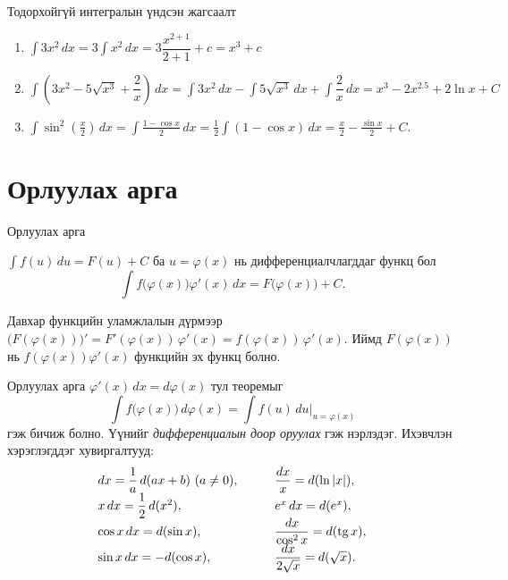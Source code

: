 \begin{frame}[allowframebreaks]{Тодорхойгүй интегралын үндсэн жагсаалт}
\begin{example}
\begin{enumerate}
\item $\displaystyle \int 3x^2\,dx=3\displaystyle \int x^2\,dx=3\dfrac{x^{2+1}}{2+1}+c=x^3+c$
\item $\displaystyle \int (3x^2 - 5\sqrt{x^3} + \dfrac{2}{x})\,dx=\displaystyle \int 3x^2 \,dx-\displaystyle \int  5\sqrt{x^3}\,dx+\displaystyle \int\dfrac{2}{x}\,dx=x^3-2x^{2.5}+2\ln x+C$
\item $
\displaystyle\int \sin^2\!\left(\frac{x}{2}\right)\,dx
= \int \frac{1-\cos x}{2}\,dx
= \frac12\int (1-\cos x)\,dx
= \frac{x}{2} - \frac{\sin x}{2} + C.
$
\end{enumerate}  
\end{example}
\end{frame}

\section{Орлуулах арга}
\begin{frame}[allowframebreaks]{Орлуулах арга}
\begin{theorem}\label{orluulah}
$\displaystyle\int f(u)\,du=F(u)+C$ ба $u=\varphi(x)$ нь дифференциалчлагддаг функц бол
\[
\int f\bigl(\varphi(x)\bigr)\varphi'(x)\,dx=F\bigl(\varphi(x)\bigr)+C .
\]
\end{theorem}
\begin{prof}
Давхар функцийн уламжлалын дүрмээр
$\bigl(F(\varphi(x))\bigr)'=F'(\varphi(x))\,\varphi'(x)=f(\varphi(x))\,\varphi'(x)$.
Иймд $F(\varphi(x))$ нь $f(\varphi(x))\varphi'(x)$ функцийн эх функц болно.
\end{prof}
\end{frame}

\begin{frame}[allowframebreaks]{Орлуулах арга}
$\varphi'(x)\,dx=d\varphi(x)$ тул теоремыг
\[
\int f\bigl(\varphi(x)\bigr)\,d\varphi(x)=\int f(u)\,du\Big|_{u=\varphi(x)}
\]
гэж бичиж болно. Үүнийг \emph{дифференциалын доор оруулах} гэж нэрлэдэг.
Ихэвчлэн хэрэглэгддэг хувиргалтууд:
\[
\renewcommand{\arraystretch}{1.6}
\begin{array}{ll@{\qquad}ll}
dx=\dfrac1a\,d(ax+b)\ (a\ne0), & & \dfrac{dx}{x}=d(\ln|x|), \\
x\,dx=\dfrac12\,d(x^2), & & e^x\,dx=d(e^x), \\
\cos x\,dx=d(\sin x), & & \dfrac{dx}{\cos^2x}=d(\tg x), \\
\sin x\,dx=-d(\cos x), & & \dfrac{dx}{2\sqrt x}=d(\sqrt x).
\end{array}
\]
\end{frame}

